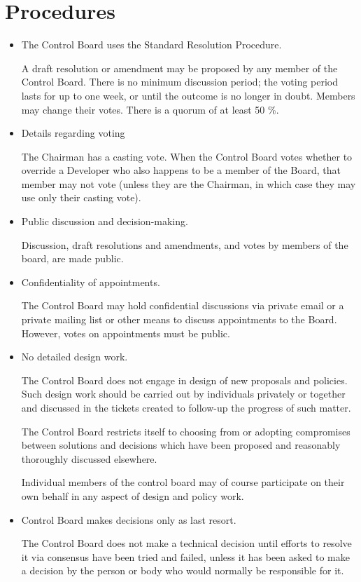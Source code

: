 \documentclass[]{article}
\begin{document}
\section{Procedures}
\begin{itemize}

\item The Control Board uses the Standard Resolution Procedure.

    A draft resolution or amendment may be proposed by any member of the Control Board. There is no minimum discussion period; the voting period lasts for up to one week, or until the outcome is no longer in doubt. Members may change their votes. There is a quorum of at least 50 \%.

\item Details regarding voting

    The Chairman has a casting vote. When the Control Board votes whether to override a Developer who also happens to be a member of the Board, that member may not vote (unless they are the Chairman, in which case they may use only their casting vote).

\item Public discussion and decision-making.

    Discussion, draft resolutions and amendments, and votes by members of the board, are made public.

\item Confidentiality of appointments.

    The Control Board may hold confidential discussions via private email or a private mailing list or other means to discuss appointments to the Board. However, votes on appointments must be public.

\item No detailed design work.

    The Control Board does not engage in design of new proposals and policies. Such design work should be carried out by individuals privately or together and discussed in the tickets created to follow-up the progress of such matter.

    The Control Board restricts itself to choosing from or adopting compromises between solutions and decisions which have been proposed and reasonably thoroughly discussed elsewhere.

    Individual members of the control board may of course participate on their own behalf in any aspect of design and policy work.

\item Control Board makes decisions only as last resort.

    The Control Board does not make a technical decision until efforts to resolve it via consensus have been tried and failed, unless it has been asked to make a decision by the person or body who would normally be responsible for it.
    
\end{itemize}
\end{document}

